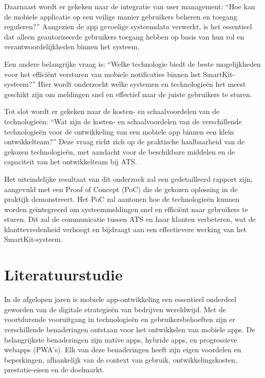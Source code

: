 Daarnaast wordt er gekeken naar de integratie van user management: “Hoe kan de mobiele applicatie op een veilige manier gebruikers beheren en toegang reguleren?” Aangezien de app gevoelige systeemdata verwerkt, is het essentieel dat alleen geautoriseerde gebruikers toegang hebben op basis van hun rol en verantwoordelijkheden binnen het systeem.

Een andere belangrijke vraag is: “Welke technologie biedt de beste mogelijkheden voor het efficiënt versturen van mobiele notificaties binnen het SmartKit-systeem?” Hier wordt onderzocht welke systemen en technologieën het meest geschikt zijn om meldingen snel en effectief naar de juiste gebruikers te sturen.

Tot slot wordt er gekeken naar de kosten- en schaalvoordelen van de technologieën: “Wat zijn de kosten- en schaalvoordelen van de verschillende technologieën voor de ontwikkeling van een mobiele app binnen een klein ontwikkelteam?” Deze vraag richt zich op de praktische haalbaarheid van de gekozen technologieën, met aandacht voor de beschikbare middelen en de capaciteit van het ontwikkelteam bij ATS.

Het uiteindelijke resultaat van dit onderzoek zal een gedetailleerd rapport zijn, aangevuld met een Proof of Concept (PoC) die de gekozen oplossing in de praktijk demonstreert. Het PoC zal aantonen hoe de technologieën kunnen worden geïntegreerd om systeemmeldingen snel en efficiënt naar gebruikers te sturen. Dit zal de communicatie tussen ATS en haar klanten verbeteren, wat de klanttevredenheid verhoogt en bijdraagt aan een effectievere werking van het SmartKit-systeem.


\section{Literatuurstudie}%
\label{sec:literatuurstudie}

In de afgelopen jaren is mobiele app-ontwikkeling een essentieel onderdeel geworden van de digitale strategieën van bedrijven wereldwijd. Met de voortdurende vooruitgang in technologieën en gebruikersbehoeften zijn er verschillende benaderingen ontstaan voor het ontwikkelen van mobiele apps. De belangrijkste benaderingen zijn native apps, hybride apps, en progressieve webapps (PWA's). Elk van deze benaderingen heeft zijn eigen voordelen en beperkingen, afhankelijk van de context van gebruik, ontwikkelingskosten, prestatie-eisen en de doelmarkt.

